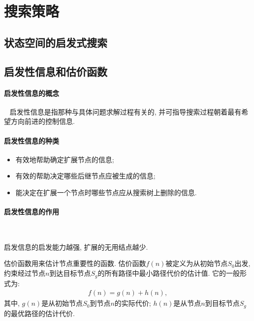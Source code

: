 \section{搜索策略}
\subsection{状态空间的启发式搜索}
\subsection{启发性信息和估价函数}
\paragraph{启发性信息的概念}~{}
启发性信息是指那种与具体问题求解过程有关的, 并可指导搜索过程朝着最有希望方向前进的控制信息.

\paragraph{启发性信息的种类}
\begin{itemize}
\item 有效地帮助确定扩展节点的信息;
\item 有效的帮助决定哪些后继节点应被生成的信息;
\item 能决定在扩展一个节点时哪些节点应从搜索树上删除的信息.
\end{itemize}
\paragraph{启发性信息的作用}~{}

启发信息的启发能力越强, 扩展的无用结点越少.

估价函数用来估计节点重要性的函数. 估价函数$f(n)$被定义为从初始节点$S_0$出发, 约束经过节点$n$到达目标节点$S_g$的所有路径中最小路径代价的估计值. 它的一般形式为:
\begin{align}
  f(n)=g(n)+h(n),
\end{align}
其中, $g(n)$是从初始节点$S_0$到节点$n$的实际代价; $h(n)$是从节点$n$到目标节点$S_g$的最优路径的估计代价.

